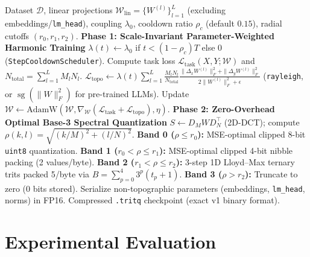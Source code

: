 \documentclass[11pt,a4paper]{article}
\begin{document}
\begin{algorithm}[t]
\caption{Riemannian Rayleigh Dirichlet Training \& Optimal Base-3 Trit Quantization (\texttt{.tritq})}
\label{alg:dreg_pipeline}
\begin{algorithmic}[1]
\REQUIRE Dataset $\mathcal{D}$, linear projections $\mathcal{W}_{\text{lin}} = \{W^{(l)}\}_{l=1}^L$ (excluding embeddings/\texttt{lm\_head}), coupling $\lambda_0$, cooldown ratio $\rho_c$ (default $0.15$), radial cutoffs $(r_0, r_1, r_2)$.
\STATE \textbf{Phase 1: Scale-Invariant Parameter-Weighted Harmonic Training}
    \STATE $\lambda(t) \leftarrow \lambda_0$ if $t < (1 - \rho_c) T$ else $0$ \quad (\texttt{StepCooldownScheduler}).
    \STATE Compute task loss $\mathcal{L}_{\text{task}}(X, Y; \mathcal{W})$ and $N_{\text{total}} = \sum_{l=1}^L M_l N_l$.
    \STATE $\mathcal{L}_{\text{topo}} \leftarrow \lambda(t) \sum_{l=1}^L \frac{M_l N_l}{N_{\text{total}}} \frac{\|\Delta_x W^{(l)}\|_F^2 + \|\Delta_y W^{(l)}\|_F^2}{2\|W^{(l)}\|_F^2 + \epsilon}$ \quad (\texttt{rayleigh}, or $\operatorname{sg}(\|W\|_F^2)$ for pre-trained LLMs).
    \STATE Update $\mathcal{W} \leftarrow \text{AdamW}(\mathcal{W}, \nabla_{\mathcal{W}}(\mathcal{L}_{\text{task}} + \mathcal{L}_{\text{topo}}), \eta)$.
\ENDFOR
\STATE \textbf{Phase 2: Zero-Overhead Optimal Base-3 Spectral Quantization}
    \STATE $S \leftarrow D_M W D_N^\top$ (2D-DCT); compute $\rho(k, l) = \sqrt{(k/M)^2 + (l/N)^2}$.
    \STATE \textbf{Band 0 ($\rho \le r_0$):} MSE-optimal clipped 8-bit \texttt{uint8} quantization.
    \STATE \textbf{Band 1 ($r_0 < \rho \le r_1$):} MSE-optimal clipped 4-bit nibble packing (2 values/byte).
    \STATE \textbf{Band 2 ($r_1 < \rho \le r_2$):} 3-step 1D Lloyd--Max ternary trits packed 5/byte via $B = \sum_{p=0}^4 3^p (t_p + 1)$.
    \STATE \textbf{Band 3 ($\rho > r_2$):} Truncate to zero (0 bits stored).
\ENDFOR
\STATE Serialize non-topographic parameters (embeddings, \texttt{lm\_head}, norms) in FP16.
\RETURN Compressed \texttt{.tritq} checkpoint (exact v1 binary format).
\end{algorithmic}
\end{algorithm}

\section{Experimental Evaluation}
\label{sec:experiments}
\end{document}
